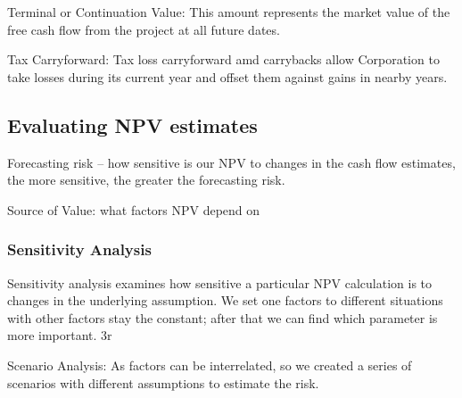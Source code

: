 \documentclass[10pt, a4paper]{article}
\begin{document}
    Terminal or Continuation Value: This amount represents the market value of the free cash flow from the project at all future dates. 


    Tax Carryforward: Tax loss carryforward  amd carrybacks allow Corporation to take losses during its current year and offset them against gains in nearby years. 

    \subsection{Evaluating NPV estimates} 
        Forecasting risk -- how sensitive is our NPV to changes in the cash flow estimates, the more sensitive, the greater the forecasting risk. 

        Source of Value: what factors NPV depend on

        \subsubsection{Sensitivity Analysis} 
            Sensitivity analysis examines how sensitive a particular NPV calculation is to changes in the underlying assumption. We set one factors to different situations with other factors stay the constant; after that we can find which parameter is more important. 3r

            Scenario Analysis: As factors can be interrelated, so we created a series of scenarios with different assumptions to estimate the risk. 
\end{document}
